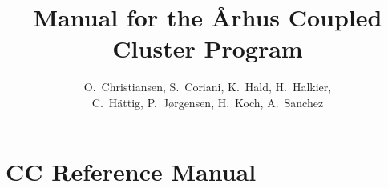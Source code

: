 \documentclass[12pt]{report}
\begin{document}
%

%


\title{Manual for the {\AA}rhus Coupled Cluster Program}

\author{
O.~Christiansen,
S.~Coriani, 
K.~Hald,
H.~Halkier,
\\
C.~H{\"a}ttig, 
P.~J{\o}rgensen,
H.~Koch, 
A.~Sanchez
}  

\maketitle

\tableofcontents


% 


%
%
% 
% 
%
%

% 
%
%
%
%
\part{CC Reference Manual}





%
%


%
%





%
%
\end{document}
